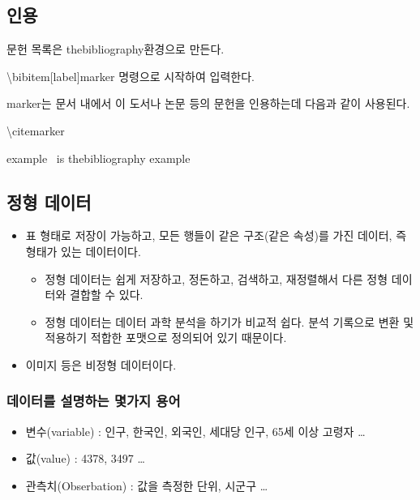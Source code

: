 \documentclass{article}
\begin{document}
\subsection{인용}
문헌 목록은 thebibliography환경으로 만든다.

\textbackslash bibitem[label]{marker} 명령으로 시작하여 입력한다.

marker는 문서 내에서 이 도서나 논문 등의 문헌을 인용하는데 다음과 같이 사용된다.

\textbackslash cite{marker}

example~\cite{ex1} is thebibliography example


\subsection{정형 데이터}
\begin{itemize}
    \item 표 형태로 저장이 가능하고, 모든 행들이 같은 구조(같은 속성)를 가진 데이터, 즉 형태가 있는 데이터이다.
    \begin{itemize}
        \item 정형 데이터는 쉽게 저장하고, 정돈하고, 검색하고, 재정렬해서 다른 정형 데이터와 결합할 수 있다.
        \item 정형 데이터는 데이터 과학 분석을 하기가 비교적 쉽다. 분석 기록으로 변환 및 적용하기 적합한 포맷으로 정의되어 있기 때문이다.
    \end{itemize}
    \item 이미지 등은 비정형 데이터이다.
\end{itemize}
\subsubsection{데이터를 설명하는 몇가지 용어}
\begin{itemize}
    \item 변수(variable) : 인구, 한국인, 외국인, 세대당 인구, 65세 이상 고령자 \ldots
    \item 값(value) : 4378, 3497 \ldots
    \item 관측치(Obserbation) : 값을 측정한 단위, 시군구 \ldots
\end{itemize}
\end{document}

